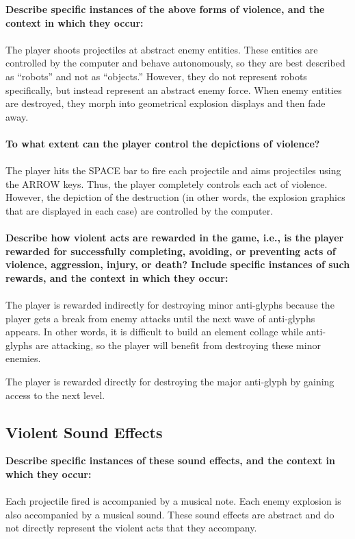 \documentclass[12pt]{article}
\begin{document}
{\bf Describe specific instances of the above forms of violence, and the context in which they occur:}
\\
\\
The player shoots projectiles at abstract enemy entities.  These entities are
controlled by the computer and behave autonomously, so they are best described 
as ``robots'' and not as ``objects.''  However, they do not represent robots 
specifically, but instead represent an abstract enemy force.  When enemy 
entities are destroyed, they morph into geometrical explosion displays and 
then fade away.
\\
\\
{\bf To what extent can the player control the depictions of violence?}
\\
\\
The player hits the SPACE bar to fire each projectile and aims projectiles
using the ARROW keys.  Thus, the player completely controls each act of 
violence.  However, the depiction of the destruction (in other words, the
explosion graphics that are displayed in each case) are controlled by the
computer.
\\
\\
{\bf Describe how violent acts are rewarded in the game, i.e., is the player 
  rewarded for successfully completing, avoiding, or preventing acts of 
  violence, aggression, injury, or death?  Include specific instances of such 
  rewards, and the context in which they occur:}
\\
\\
The player is rewarded indirectly for destroying minor anti-glyphs because the
player gets a break from enemy attacks until the next wave of anti-glyphs 
appears.  In other words, it is difficult to build an element collage while
anti-glyphs are attacking, so the player will benefit from destroying these minor enemies.

The player is rewarded directly for destroying the major anti-glyph by gaining
access to the next level.


\subsection{Violent Sound Effects}

{\bf Describe specific instances of these sound effects, and the context in which they occur:}
\\
\\
Each projectile fired is accompanied by a musical note.
Each enemy explosion is also accompanied by a musical sound.
These sound effects are abstract and do not directly represent the violent acts that they accompany.
\end{document}
